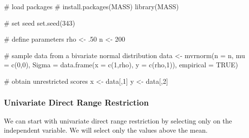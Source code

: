 \documentclass[
  letterpaper,
  DIV=11,
  numbers=noendperiod]{scrreprt}
\newenvironment{Shaded}{\begin{snugshade}}{\end{snugshade}}
\newcommand{\AttributeTok}[1]{\textcolor[rgb]{0.40,0.45,0.13}{#1}}
\newcommand{\CommentTok}[1]{\textcolor[rgb]{0.37,0.37,0.37}{#1}}
\newcommand{\ConstantTok}[1]{\textcolor[rgb]{0.56,0.35,0.01}{#1}}
\newcommand{\DecValTok}[1]{\textcolor[rgb]{0.68,0.00,0.00}{#1}}
\newcommand{\FunctionTok}[1]{\textcolor[rgb]{0.28,0.35,0.67}{#1}}
\newcommand{\NormalTok}[1]{\textcolor[rgb]{0.00,0.23,0.31}{#1}}
\newcommand{\OtherTok}[1]{\textcolor[rgb]{0.00,0.23,0.31}{#1}}
\begin{document}
\begin{Shaded}
\begin{Highlighting}[]
\CommentTok{\# load packages}
\CommentTok{\# install.packages(\textquotesingle{}MASS\textquotesingle{})}
\FunctionTok{library}\NormalTok{(MASS)}

\CommentTok{\# set seed}
\FunctionTok{set.seed}\NormalTok{(}\DecValTok{343}\NormalTok{)}

\CommentTok{\# define parameters }
\NormalTok{rho }\OtherTok{\textless{}{-}}\NormalTok{ .}\DecValTok{50}
\NormalTok{n }\OtherTok{\textless{}{-}} \DecValTok{200}

\CommentTok{\# sample data from a bivariate normal distribution}
\NormalTok{data }\OtherTok{\textless{}{-}} \FunctionTok{mvrnorm}\NormalTok{(}\AttributeTok{n =}\NormalTok{ n,}
                \AttributeTok{mu =} \FunctionTok{c}\NormalTok{(}\DecValTok{0}\NormalTok{,}\DecValTok{0}\NormalTok{),}
                \AttributeTok{Sigma =} \FunctionTok{data.frame}\NormalTok{(}\AttributeTok{x =} \FunctionTok{c}\NormalTok{(}\DecValTok{1}\NormalTok{,rho),}
                                  \AttributeTok{y =} \FunctionTok{c}\NormalTok{(rho,}\DecValTok{1}\NormalTok{)),}
                \AttributeTok{empirical =} \ConstantTok{TRUE}\NormalTok{)}

\CommentTok{\# obtain unrestricted scores}
\NormalTok{x }\OtherTok{\textless{}{-}}\NormalTok{ data[,}\DecValTok{1}\NormalTok{]}
\NormalTok{y }\OtherTok{\textless{}{-}}\NormalTok{ data[,}\DecValTok{2}\NormalTok{]}
\end{Highlighting}
\end{Shaded}

\hypertarget{univariate-direct-range-restriction-1}{%
\subsubsection*{Univariate Direct Range
Restriction}\label{univariate-direct-range-restriction-1}}

We can start with univariate direct range restriction by selecting only
on the independent variable. We will select only the values above the
mean.
\end{document}
